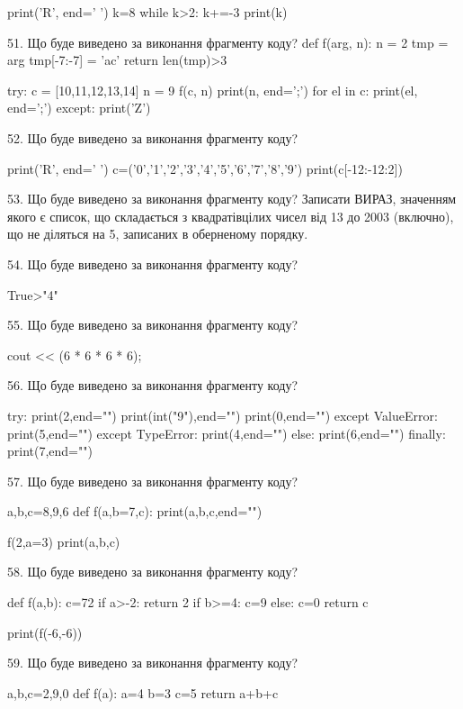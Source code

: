 \documentclass[11pt]{article}
\begin{document}
print('R', end=' ')
k=8
while k>2:
    k+=-3
print(k)


51. Що буде виведено за виконання фрагменту коду?
def f(arg, n):
    n = 2
    tmp = arg
    tmp[-7:-7] = 'ac'
    return len(tmp)>3

try:
    c = [10,11,12,13,14]
    n = 9
    f(c, n)
    print(n, end=';')
    for el in c:
        print(el, end=';')
except:
    print('Z')

52. Що буде виведено за виконання фрагменту коду?

print('R', end=' ')
c=('0','1','2','3','4','5','6','7','8','9')
print(c[-12:-12:2])


53. Що буде виведено за виконання фрагменту коду?
Записати ВИРАЗ, значенням якого є список, що складається з квадратівцілих чисел від 13 до 2003 (включно), що не діляться на 5, записаних в обернено\-му порядку.

54. Що буде виведено за виконання фрагменту коду?

True>"4"

55. Що буде виведено за виконання фрагменту коду?

cout << (6 * 6 * 6 * 6);

56. Що буде виведено за виконання фрагменту коду?

try:
    print(2,end="")
    print(int("9"),end="")
    print(0,end="")
except ValueError: print(5,end="")
except TypeError: print(4,end="")
else: print(6,end="")
finally: print(7,end="")


57. Що буде виведено за виконання фрагменту коду?

a,b,c=8,9,6
def f(a,b=7,c):
    print(a,b,c,end="")

f(2,a=3)
print(a,b,c)


58. Що буде виведено за виконання фрагменту коду?

def f(a,b):
    c=72
    if a>-2:
        return 2
    if b>=4:
         c=9
    else: 
        c=0
    return c

print(f(-6,-6))

59. Що буде виведено за виконання фрагменту коду?

a,b,c=2,9,0
def f(a):
    a=4
    b=3
    c=5
    return a+b+c
\end{document}
